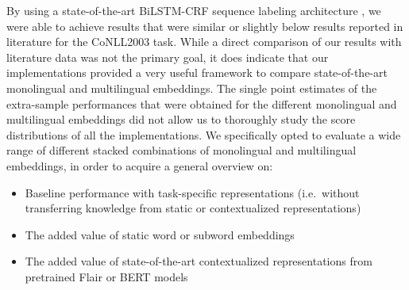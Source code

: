 \documentclass[12pt,a4paper,]{book}
\providecommand{\tightlist}{%
  \setlength{\itemsep}{0pt}\setlength{\parskip}{0pt}}
\begin{document}
By using a state-of-the-art BiLSTM-CRF sequence labeling architecture \citep{akbik2018, huang2015, lample2016}, we were able to achieve results that were similar or slightly below results reported in literature for the CoNLL2003 task. While a direct comparison of our results with literature data was not the primary goal, it does indicate that our implementations provided a very useful framework to compare state-of-the-art monolingual and multilingual embeddings. The single point estimates of the extra-sample performances that were obtained for the different monolingual and multilingual embeddings did not allow us to thoroughly study the score distributions of all the implementations. We specifically opted to evaluate a wide range of different stacked combinations of monolingual and multilingual embeddings, in order to acquire a general overview on:

\begin{itemize}
\tightlist
\item
  Baseline performance with task-specific representations (i.e.~without transferring knowledge from static or contextualized representations)
\item
  The added value of static word or subword embeddings
\item
  The added value of state-of-the-art contextualized representations from pretrained Flair or BERT models
\end{itemize}
\end{document}
